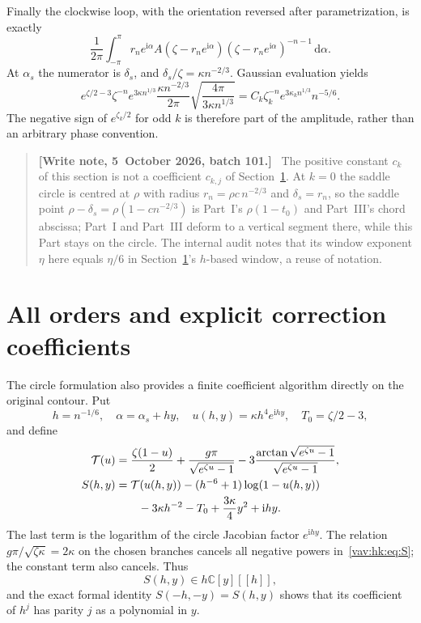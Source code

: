 \documentclass[11pt]{article}
\theoremstyle{remark}\newtheorem{remark}[theorem]{Remark}
\newcommand{\ii}{\mathrm i}
\newcommand{\dd}{\,\mathrm d}
\newenvironment{writenoteb}{\begin{quote}\small\raggedright\textbf{[Write note, 5~October 2026, batch 101.]}\ }{\end{quote}}
\newcommand{\C}{\mathbb C}
\begin{document}
Finally the clockwise loop, with the orientation reversed after parametrization, is exactly
\begin{equation}\label{vav:hk:eq:circleintegral}
 \frac1{2\pi}\int_{-\pi}^{\pi}
 r_ne^{\ii\alpha} A(\zeta-r_ne^{\ii\alpha})
 (\zeta-r_ne^{\ii\alpha})^{-n-1}\dd\alpha.
\end{equation}
At $\alpha_s$ the numerator is $\delta_s$, and $\delta_s/\zeta=\kappa n^{-2/3}$. Gaussian evaluation yields
\[
 e^{\zeta/2-3}\zeta^{-n}e^{3\kappa n^{1/3}}
 \frac{\kappa n^{-2/3}}{2\pi}
 \sqrt{\frac{4\pi}{3\kappa n^{1/3}}}
 =C_k\zeta_k^{-n}e^{3\kappa_kn^{1/3}}n^{-5/6}.
\]
The negative sign of $e^{\zeta_k/2}$ for odd $k$ is therefore part of the amplitude, rather than an arbitrary phase convention.
\begin{writenoteb}
The positive constant $c_k$ of this section is not a coefficient $c_{k,j}$
of Section~\ref{vav:hk:sec:allorders}. At $k=0$ the saddle circle is
centred at $\rho$ with radius $r_n=\rho c\,n^{-2/3}$ and $\delta_s=r_n$, so
the saddle point $\rho-\delta_s=\rho(1-cn^{-2/3})$ is Part~I's
$\rho(1-t_0)$ and Part~III's chord abscissa; Part~I and Part~III deform to
a vertical segment there, while this Part stays on the circle. The internal
audit  notes that its
window exponent $\eta$ here equals $\eta/6$ in
Section~\ref{vav:hk:sec:allorders}'s $h$-based window, a reuse of notation.
\end{writenoteb}

\section{All orders and explicit correction coefficients}\label{vav:hk:sec:allorders}
The circle formulation also provides a finite coefficient algorithm directly on the original contour. Put
\[
 h=n^{-1/6},\quad \alpha=\alpha_s+hy,\quad
 u(h,y)=\kappa h^4e^{\ii hy},\quad T_0=\zeta/2-3,
\]
and define
\begin{align}
 \mathcal T(u)&=\frac{\zeta(1-u)}2
 +\frac{g\pi}{\sqrt{e^{\zeta u}-1}}
 -3\frac{\arctan\sqrt{e^{\zeta u}-1}}{\sqrt{e^{\zeta u}-1}},\label{vav:hk:eq:Tcal}\\
 S(h,y)&=\mathcal T(u(h,y))-(h^{-6}+1)\log(1-u(h,y))\notag\\
 &\hspace{7mm}-3\kappa h^{-2}-T_0+\frac{3\kappa}{4}y^2+\ii hy.\label{vav:hk:eq:S}
\end{align}
The last term is the logarithm of the circle Jacobian factor $e^{\ii hy}$. The relation $g\pi/\sqrt{\zeta\kappa}=2\kappa$ on the chosen branches cancels all negative powers in~\eqref{vav:hk:eq:S}; the constant term also cancels. Thus
\[
 S(h,y)\in h\C[y][[h]],
\]
and the exact formal identity $S(-h,-y)=S(h,y)$ shows that its coefficient of $h^j$ has parity $j$ as a polynomial in $y$.
\end{document}
